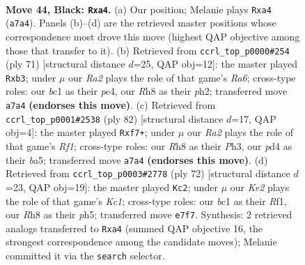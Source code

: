\documentclass[11pt]{article}
\begin{document}
\clearpage

\begin{figure}[p]\centering
\begin{subfigure}{0.46\textwidth}\centering
\resizebox{\linewidth}{!}{%
\newchessgame
\chessboard[
  setfen={7r/r3k3/1pp3p1/6p1/Pp1PK3/8/2R5/2B5 b - - 0 44},
  showmover=false,
  pgfstyle=straightmove, color=movearrow, markmove={a7-a4}
]}
\caption{}
\end{subfigure}\hfill
\begin{subfigure}{0.46\textwidth}\centering
\resizebox{\linewidth}{!}{%
\newchessgame
\chessboard[
  setfen={6k1/8/3p4/pp5p/3RPP1K/rP6/7P/8 b - - 2 36},
  showmover=false,
  pgfstyle=straightmove, color=movearrow, markmove={a3-b3}
]}
\caption{}
\end{subfigure}
\\[4pt]
\begin{subfigure}{0.46\textwidth}\centering
\resizebox{\linewidth}{!}{%
\newchessgame
\chessboard[
  setfen={1r6/4pp1k/3p3P/b2P4/8/PP5P/8/2K2R2 w - - 0 42},
  showmover=false,
  pgfstyle=straightmove, color=movearrow, markmove={f1-f7}
]}
\caption{}
\end{subfigure}\hfill
\begin{subfigure}{0.46\textwidth}\centering
\resizebox{\linewidth}{!}{%
\newchessgame
\chessboard[
  setfen={2k5/2p2p2/p7/7p/PP1r4/1P4P1/8/2K2R2 w - - 0 37},
  showmover=false,
  pgfstyle=straightmove, color=movearrow, markmove={c1-c2}
]}
\caption{}
\end{subfigure}
\caption{\textbf{Move 44, Black: \texttt{Rxa4}.} (a) Our position; Melanie plays \texttt{Rxa4} (\texttt{a7a4}). Panels (b)--(d) are the retrieved master positions whose correspondence most drove this move (highest QAP objective among those that transfer to it). (b) Retrieved from \texttt{ccrl\_top\_p0000\#254} (ply 71) [structural distance $d$=25, QAP obj=12]: the master played \texttt{Rxb3}; under $\mu$ our \emph{Ra2} plays the role of that game's \emph{Ra6}; cross-type roles: our \emph{b}c1 as their \emph{p}e4, our \emph{R}h8 as their \emph{p}h2; transferred move \texttt{a7a4} \textbf{(endorses this move)}. (c) Retrieved from \texttt{ccrl\_top\_p0001\#2538} (ply 82) [structural distance $d$=17, QAP obj=4]: the master played \texttt{Rxf7+}; under $\mu$ our \emph{Ra2} plays the role of that game's \emph{Rf1}; cross-type roles: our \emph{R}h8 as their \emph{P}h3, our \emph{p}d4 as their \emph{b}a5; transferred move \texttt{a7a4} \textbf{(endorses this move)}. (d) Retrieved from \texttt{ccrl\_top\_p0003\#2778} (ply 72) [structural distance $d$=23, QAP obj=19]: the master played \texttt{Kc2}; under $\mu$ our \emph{Ke2} plays the role of that game's \emph{Kc1}; cross-type roles: our \emph{b}c1 as their \emph{R}f1, our \emph{R}h8 as their \emph{p}h5; transferred move \texttt{e7f7}. Synthesis: 2 retrieved analogs transferred to \texttt{Rxa4} (summed QAP objective 16, the strongest correspondence among the candidate moves); Melanie committed it via the \texttt{search} selector.}
\label{fig:thought-m87}
\end{figure}
\end{document}
